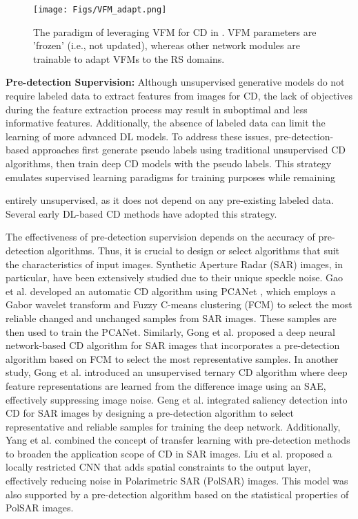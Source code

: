 \begin{figure*}[t!]
	\begin{center}
        \texttt{[image: Figs/VFM\_adapt.png]}
	\end{center}
	\caption{The paradigm of leveraging VFM for CD in \cite{ding2024samcd}. VFM parameters are 'frozen' (i.e., not updated), whereas other network modules are trainable to adapt VFMs to the RS domains.}
	\label{fig.VFM_CD}
\end{figure*}

\textbf{Pre-detection Supervision:}\label{sec:pre_detection}
Although unsupervised generative models do not require labeled data to extract features from images for CD, the lack of objectives during the feature extraction process may result in suboptimal and less informative features. Additionally, the absence of labeled data can limit the learning of more advanced DL models. To address these issues, pre-detection-based approaches first generate pseudo labels using traditional unsupervised CD algorithms, then train deep CD models with the pseudo labels. This strategy emulates supervised learning paradigms for training purposes while remaining

entirely unsupervised, as it does not depend on any pre-existing labeled data. Several early DL-based CD methods have adopted this strategy.

\par The effectiveness of pre-detection supervision depends on the accuracy of pre-detection algorithms. Thus, it is crucial to design or select algorithms that suit the characteristics of input images. Synthetic Aperture Radar (SAR) images, in particular, have been extensively studied due to their unique speckle noise. Gao et al. \cite{Gao2016Automatic} developed an automatic CD algorithm using PCANet \cite{Chan2015PCANet}, which employs a Gabor wavelet transform and Fuzzy C-means clustering (FCM) to select the most reliable changed and unchanged samples from SAR images. These samples are then used to train the PCANet. Similarly, Gong et al. \cite{Gong2016Change} proposed a deep neural network-based CD algorithm for SAR images that incorporates a pre-detection algorithm based on FCM to select the most representative samples. In another study, Gong et al. \cite{Gong2017Feature} introduced an unsupervised ternary CD algorithm where deep feature representations are learned from the difference image using an SAE, effectively suppressing image noise. Geng et al. \cite{Geng2019Saliency} integrated saliency detection into CD for SAR images by designing a pre-detection algorithm to select representative and reliable samples for training the deep network. Additionally, Yang et al. \cite{yang2019transferred} combined the concept of transfer learning with pre-detection methods to broaden the application scope of CD in SAR images. Liu et al. \cite{Liu2019Local} proposed a locally restricted CNN that adds spatial constraints to the output layer, effectively reducing noise in Polarimetric SAR (PolSAR) images. This model was also supported by a pre-detection algorithm based on the statistical properties of PolSAR images. 

